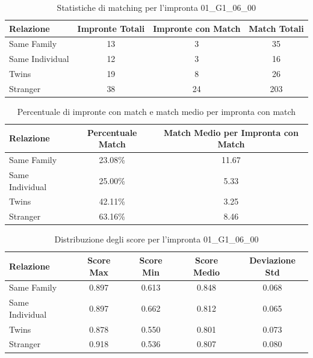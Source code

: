 \begin{table}[htbp]
\centering
\caption{Statistiche di matching per l'impronta 01\_G1\_06\_00}
\label{tab:results_01_G1_06_00}
\begin{tabular}{|l|c|c|c|}
\hline
\textbf{Relazione} & \textbf{Impronte Totali} & \textbf{Impronte con Match} & \textbf{Match Totali} \\
\hline
Same Family & 13 & 3 & 35 \\
\hline
Same Individual & 12 & 3 & 16 \\
\hline
Twins & 19 & 8 & 26 \\
\hline
Stranger & 38 & 24 & 203 \\
\hline
\end{tabular}
\end{table}


\begin{table}[htbp]
\centering
\caption{Percentuale di impronte con match e match medio per impronta con match}
\label{tab:match_percentage_01_G1_06_00}
\begin{tabular}{|l|c|c|}
\hline
\textbf{Relazione} & \textbf{Percentuale Match} & \textbf{Match Medio per Impronta con Match} \\
\hline
Same Family & 23.08\% & 11.67 \\
\hline
Same Individual & 25.00\% & 5.33 \\
\hline
Twins & 42.11\% & 3.25 \\
\hline
Stranger & 63.16\% & 8.46 \\
\hline
\end{tabular}
\end{table}


\begin{table}[htbp]
\centering
\caption{Distribuzione degli score per l'impronta 01\_G1\_06\_00}
\label{tab:scores_01_G1_06_00}
\begin{tabular}{|l|c|c|c|c|}
\hline
\textbf{Relazione} & \textbf{Score Max} & \textbf{Score Min} & \textbf{Score Medio} & \textbf{Deviazione Std} \\
\hline
Same Family & 0.897 & 0.613 & 0.848 & 0.068 \\
\hline
Same Individual & 0.897 & 0.662 & 0.812 & 0.065 \\
\hline
Twins & 0.878 & 0.550 & 0.801 & 0.073 \\
\hline
Stranger & 0.918 & 0.536 & 0.807 & 0.080 \\
\hline
\end{tabular}
\end{table}

